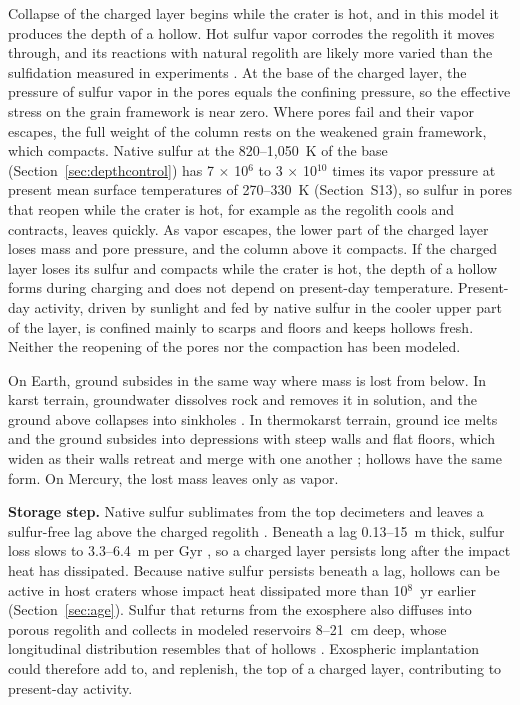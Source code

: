 \documentclass[article,review]{planetary}
\begin{document}
Collapse of the charged layer begins while the crater is hot, and in this model it produces the depth of a hollow. Hot sulfur vapor corrodes the regolith it moves through, and its reactions with natural regolith are likely more varied than the sulfidation measured in experiments \parencite{renggli2022,renggli2023}. At the base of the charged layer, the pressure of sulfur vapor in the pores equals the confining pressure, so the effective stress on the grain framework is near zero. Where pores fail and their vapor escapes, the full weight of the column rests on the weakened grain framework, which compacts. Native sulfur at the 820--1,050~K of the base (Section~\ref{sec:depthcontrol}) has 7 $\times$ 10$^6$ to 3 $\times$ 10$^{10}$ times its vapor pressure at present mean surface temperatures of 270--330~K (Section~S13), so sulfur in pores that reopen while the crater is hot, for example as the regolith cools and contracts, leaves quickly. As vapor escapes, the lower part of the charged layer loses mass and pore pressure, and the column above it compacts. If the charged layer loses its sulfur and compacts while the crater is hot, the depth of a hollow forms during charging and does not depend on present-day temperature. Present-day activity, driven by sunlight and fed by native sulfur in the cooler upper part of the layer, is confined mainly to scarps and floors and keeps hollows fresh. Neither the reopening of the pores nor the compaction has been modeled.

On Earth, ground subsides in the same way where mass is lost from below. In karst terrain, groundwater dissolves rock and removes it in solution, and the ground above collapses into sinkholes \parencite{ford2007}. In thermokarst terrain, ground ice melts and the ground subsides into depressions with steep walls and flat floors, which widen as their walls retreat and merge with one another \parencite{czudek1970}; hollows have the same form. On Mercury, the lost mass leaves only as vapor.

\textbf{Storage step.} Native sulfur sublimates from the top decimeters and leaves a sulfur-free lag above the charged regolith \parencite{blewett2013,blewett2016,thomas2016}. Beneath a lag 0.13--15~m thick, sulfur loss slows to 3.3--6.4~m per Gyr \parencite{phillips2021}, so a charged layer persists long after the impact heat has dissipated. Because native sulfur persists beneath a lag, hollows can be active in host craters whose impact heat dissipated more than 10$^8$~yr earlier (Section~\ref{sec:age}). Sulfur that returns from the exosphere also diffuses into porous regolith and collects in modeled reservoirs 8--21~cm deep, whose longitudinal distribution resembles that of hollows \parencite{verkercke2025}. Exospheric implantation could therefore add to, and replenish, the top of a charged layer, contributing to present-day activity.
\end{document}
